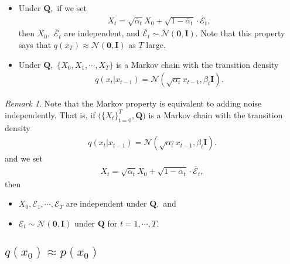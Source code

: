\documentclass[
]{article}
\providecommand{\tightlist}{%
  \setlength{\itemsep}{0pt}\setlength{\parskip}{0pt}}\usepackage{longtable,booktabs,array}
\theoremstyle{remark}
\newtheorem*{remark}{Remark}
\begin{document}
\begin{itemize}
\item
  Under \(\mathbf{Q},\) if we set \[
  \begin{aligned}
    X_t = \sqrt{\overline{\alpha}_t}X_{0}+\sqrt{1-\overline{\alpha}_t}\cdot \overline{\mathcal{E}}_t,
  \end{aligned}
  \] then \(X_0,\) \(\overline{\mathcal{E}}_t\) are independent, and
  \(\overline{\mathcal{E}}_t\sim \mathcal{N}(\mathbf{0},\mathbf{I}).\)
  Note that this property says that
  \(q(x_T)\approx \mathcal{N}(\mathbf{\mathbf{0},\mathbf{I}})\) as \(T\)
  large.
\item
  Under \(\mathbf{Q},\) \(\lbrace X_0,X_1,\cdots,X_T\rbrace\) is a
  Markov chain with the transition density \[
  \begin{aligned}
    q(x_t\vert x_{t-1}) = \mathcal{N}(\sqrt{\alpha_t}x_{t-1},\beta_t \mathbf{I}).
  \end{aligned}
  \]
\end{itemize}

\begin{remark}
Note that the Markov property is equivalent to adding noise
independently. That is, if
\(\bigl( \lbrace X_t\rbrace_{t=0}^T, \mathbf{Q} \bigr)\) is a Markov
chain with the transition density \[
\begin{aligned}
  q(x_t\vert x_{t-1}) = \mathcal{N}(\sqrt{\alpha_t}x_{t-1},\beta_t \mathbf{I}).
\end{aligned}
\] and we set \[
\begin{aligned}
  X_t = \sqrt{\overline{\alpha}_t}X_{0}+\sqrt{1-\overline{\alpha}_t}\cdot \overline{\mathcal{E}}_t,
\end{aligned}
\] then

\begin{itemize}
\tightlist
\item
  \(X_0,\mathcal{E}_1,\cdots,\mathcal{E}_T\) are independent under
  \(\mathbf{Q},\) and
\item
  \(\mathcal{E}_t\sim \mathcal{N}(\mathbf{0},\mathbf{I})\) under
  \(\mathbf{Q}\) for \(t=1,\cdots, T.\)
\end{itemize}

\end{remark}

\subsection{\texorpdfstring{\(q(x_0) \approx p(x_0)\)}{q(x\_0) \textbackslash approx p(x\_0)}}\label{qx_0-approx-px_0}
\end{document}
